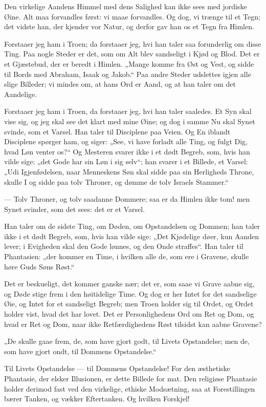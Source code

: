 \documentclass[12pt,a4paper]{book}
\newcommand{\apage}[1]{\marginnote{\footnotesize\textit{[#1]}}}
\begin{document}
Den virkelige Aandens Himmel med dens Salighed kan ikke sees med jordiske
Øine. Alt maa forvandles først: vi maae forvandles. Og dog, vi trænge til et
Tegn; det vidste han, der kjender vor Natur, og derfor gav han os et Tegn fra
Himlen.

Forstaaer jeg ham i Troen; da forstaaer jeg, hvi han taler saa forunderlig om
disse Ting. Paa nogle Steder er det, som om Alt blev sandseligt i Kjød og
Blod. Det er et Gjæstebud, der er beredt i Himlen. „Mange komme fra Øst og
Vest, og sidde til Bords med Abraham, Isaak og Jakob.“ Paa andre Steder
udslettes igjen alle slige Billeder; vi mindes om, at hans Ord er Aand, og at
han taler om det Aandelige.

Forstaaer jeg ham i Troen, da forstaaer jeg, hvi han taler saaledes. Et Syn
skal vise sig, og jeg skal see det klart med mine Øine; og dog i samme Nu
skal Synet svinde, som et Varsel. Han taler til Disciplene paa Veien. Og En
iblandt Disciplene spørger ham, og siger: „See, vi have forladt alle Ting, og
fulgt Dig, hvad Løn venter os?“ Og Mesteren svarer ikke i et dødt Begreb,
som, hvis han vilde sige: „det Gode har sin Løn i sig selv“; han svarer i et
Billede, et Varsel: „Udi Igjenfødelsen, naar Menneskens Søn \apage{21}
skal sidde paa sin Herligheds Throne, skulle I og sidde paa tolv Throner, og
dømme de tolv Israels Stammer.“

--- Tolv Throner, og tolv saadanne Dommere; saa er da Himlen ikke tom! men
Synet svinder, som det sees: det er et Varsel.

Han taler om de sidste Ting, om Døden, om Opstandelsen og Dommen; han taler
ikke i et dødt Begreb, som, hvis han vilde sige: „Det Kjødelige døer, kun
Aanden lever; i Evigheden skal den Gode lønnes, og den Onde straffes“. Han
taler til Phantasien: „der kommer en Time, i hvilken alle de, som ere i
Gravene, skulle høre Guds Søns Røst.“

Det er beskueligt, det kommer ganske nær; det er, som saae vi Grave aabne
sig, og Døde stige frem i den høitidelige Time. Og dog er her Intet for det
sandselige Øie, og Intet for et sandseligt Begreb; men Troen holder sig til
Ordet, og Ordet holder vist, hvad det har lovet. Det er Personlighedens Ord
om Ret og Dom, og hvad er Ret og Dom, naar ikke Retfærdighedens Røst tilsidst
kan aabne Gravene?

„De skulle gaae frem, de, som have gjort godt, til Livets Opstandelse; men
de, som have gjort ondt, til Dommens Opstandelse.“

Til Livets Opstandelse --- til Dommens Opstandelse! For den æsthetiske
Phantasie, der elsker Illusionen, er dette Billede for mat. Den religiøse
Phantasie holder derimod fast ved den virkelige, ethiske Modsætning, saa at
Forestillingen bærer Tanken, og vækker Eftertanken. Og hvilken Forskjel!
\end{document}
